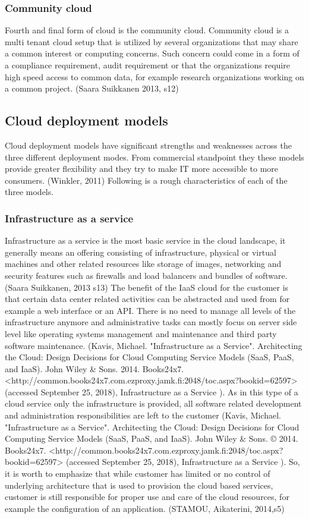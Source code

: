 \documentclass{article}
\begin{document}
\subsubsection{Community cloud}
Fourth and final form of cloud is the community cloud. Community cloud is a multi tenant cloud setup that is utilized by several organizations that may share a common interest or computing concerns. Such concern could come in a form of a compliance requirement, audit requirement or that the organizations require high speed access to common data, for example research organizations working on a common project. (Saara Suikkanen 2013, s12)
\subsection{Cloud deployment models}
Cloud deployment models have significant strengths and weaknesses across the three different deployment modes. From commercial standpoint they these models provide greater flexibility and they try to make IT more accessible to more consumers. (Winkler, 2011) Following is a rough characteristics of each of the three models.
\subsubsection{Infrastructure as a service}
Infrastructure as a service is the most basic service in the cloud landscape, it generally means an offering consisting of infrastructure, physical or virtual machines and other related resources like storage of images, networking and security features such as firewalls and load balancers and bundles of software. (Saara Suikkanen, 2013 s13)
The benefit of the IaaS cloud for the customer is that certain data center related activities can be abstracted and used from for example a web interface or an API. There is no need to manage all levels of the infrastructure anymore and administrative tasks can mostly focus on server side level like operating systems management and maintenance and third party software maintenance. (Kavis, Michael. "Infrastructure as a Service". Architecting the Cloud: Design Decisions for Cloud Computing Service Models (SaaS, PaaS, and IaaS). John Wiley \& Sons. 2014. Books24x7. <http://common.books24x7.com.ezproxy.jamk.fi:2048/toc.aspx?bookid=62597> (accessed September 25, 2018), Infrastructure as a Service ).
As in this type of a cloud service only the infrastructure is provided, all software related development and administration responsibilities are left to the customer (Kavis, Michael. "Infrastructure as a Service". Architecting the Cloud: Design Decisions for Cloud Computing Service Models (SaaS, PaaS, and IaaS). John Wiley \& Sons. © 2014. Books24x7. <http://common.books24x7.com.ezproxy.jamk.fi:2048/toc.aspx?bookid=62597> (accessed September 25, 2018), Infrastructure as a Service ).
So, it is worth to emphasize that while customer has limited or no control of underlying architecture that is used to provision the cloud based services, customer is still responsible for proper use and care of the cloud resources, for example the configuration of an application. (STAMOU, Aikaterini, 2014,s5)
\end{document}
